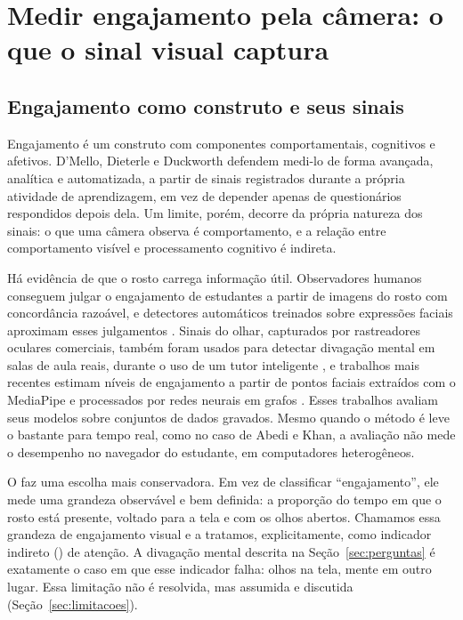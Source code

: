 \section{\label{sec:engajamento}Medir engajamento pela câmera: o que o sinal visual captura}

\subsection{Engajamento como construto e seus sinais}

Engajamento é um construto com componentes comportamentais, cognitivos e afetivos. D'Mello, Dieterle e Duckworth \cite{DDD17} defendem medi-lo de forma avançada, analítica e automatizada, a partir de sinais registrados durante a própria atividade de aprendizagem, em vez de depender apenas de questionários respondidos depois dela. Um limite, porém, decorre da própria natureza dos sinais: o que uma câmera observa é comportamento, e a relação entre comportamento visível e processamento cognitivo é indireta.

Há evidência de que o rosto carrega informação útil. Observadores humanos conseguem julgar o engajamento de estudantes a partir de imagens do rosto com concordância razoável, e detectores automáticos treinados sobre expressões faciais aproximam esses julgamentos \cite{WSL14}. Sinais do olhar, capturados por rastreadores oculares comerciais, também foram usados para detectar divagação mental em salas de aula reais, durante o uso de um tutor inteligente \cite{HKM19}, e trabalhos mais recentes estimam níveis de engajamento a partir de pontos faciais extraídos com o MediaPipe e processados por redes neurais em grafos \cite{AK24}. Esses trabalhos avaliam seus modelos sobre conjuntos de dados gravados. Mesmo quando o método é leve o bastante para tempo real, como no caso de Abedi e Khan, a avaliação não mede o desempenho no navegador do estudante, em computadores heterogêneos.

O \ferramenta faz uma escolha mais conservadora. Em vez de classificar ``engajamento'', ele mede uma grandeza observável e bem definida: a proporção do tempo em que o rosto está presente, voltado para a tela e com os olhos abertos. Chamamos essa grandeza de engajamento visual e a tratamos, explicitamente, como indicador indireto () de atenção. A divagação mental descrita na Seção~\ref{sec:perguntas} é exatamente o caso em que esse indicador falha: olhos na tela, mente em outro lugar. Essa limitação não é resolvida, mas assumida e discutida (Seção~\ref{sec:limitacoes}).

